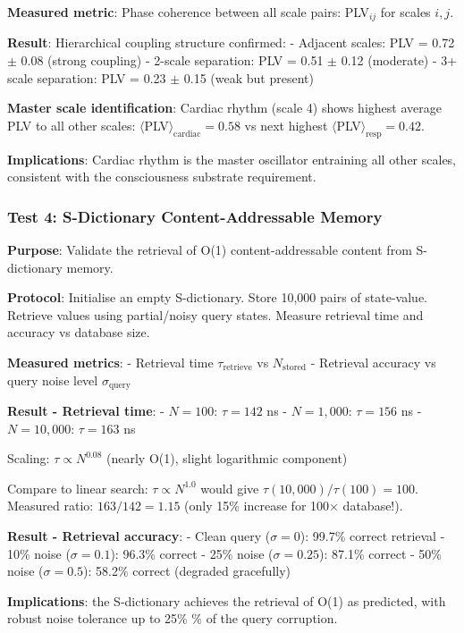 \documentclass[11pt,onecolumn]{article}
\begin{document}
\textbf{Measured metric}: Phase coherence between all scale pairs: PLV$_{ij}$ for scales $i, j$.

\textbf{Result}: Hierarchical coupling structure confirmed:
- Adjacent scales: PLV = 0.72 $\pm$ 0.08 (strong coupling)
- 2-scale separation: PLV = 0.51 $\pm$ 0.12 (moderate)
- 3+ scale separation: PLV = 0.23 $\pm$ 0.15 (weak but present)

\textbf{Master scale identification}: Cardiac rhythm (scale 4) shows highest average PLV to all other scales: $\langle$PLV$\rangle_{\text{cardiac}} = 0.58$ vs next highest $\langle$PLV$\rangle_{\text{resp}} = 0.42$.

\textbf{Implications}: Cardiac rhythm is the master oscillator entraining all other scales, consistent with the consciousness substrate requirement.

\subsubsection{Test 4: S-Dictionary Content-Addressable Memory}

\textbf{Purpose}: Validate the retrieval of O(1) content-addressable content from S-dictionary memory.

\textbf{Protocol}: Initialise an empty S-dictionary. Store 10,000 pairs of state-value. Retrieve values using partial/noisy query states. Measure retrieval time and accuracy vs database size.

\textbf{Measured metrics}:
- Retrieval time $\tau_{\text{retrieve}}$ vs $N_{\text{stored}}$
- Retrieval accuracy vs query noise level $\sigma_{\text{query}}$

\textbf{Result - Retrieval time}:
- $N = 100$: $\tau = 142$ ns
- $N = 1,000$: $\tau = 156$ ns
- $N = 10,000$: $\tau = 163$ ns

Scaling: $\tau \propto N^{0.08}$ (nearly O(1), slight logarithmic component)

Compare to linear search: $\tau \propto N^{1.0}$ would give $\tau(10,000)/\tau(100) = 100$. Measured ratio: $163/142 = 1.15$ (only 15\% increase for 100$\times$ database!).

\textbf{Result - Retrieval accuracy}:
- Clean query ($\sigma = 0$): 99.7\% correct retrieval
- 10\% noise ($\sigma = 0.1$): 96.3\% correct
- 25\% noise ($\sigma = 0.25$): 87.1\% correct
- 50\% noise ($\sigma = 0.5$): 58.2\% correct (degraded gracefully)

\textbf{Implications}: the S-dictionary achieves the retrieval of O(1) as predicted, with robust noise tolerance up to 25\% \% of the query corruption.
\end{document}
